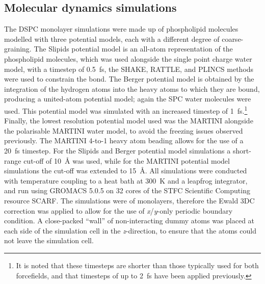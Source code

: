 \subsection{Molecular dynamics simulations}
The DSPC monolayer simulations were made up of phospholipid molecules modelled with three potential models, each with a different degree of coarse-graining.
The Slipids potential model is an all-atom representation of the phospholipid molecules,\autocite{jambeck_derivation_2012} which was used alongside the single point charge water model,\autocite[abbreviated to SPC]{berendsen_missing_1987} with a timestep of \SI{0.5}{\femto\second}, the SHAKE, RATTLE, and PLINCS methods were used to constrain the  bond.\autocite{miyamoto_settle_1992,hess_p-lincs_2008}
The Berger potential model is obtained by the integration of the hydrogen atoms into the heavy atoms to which they are bound, producing a united-atom potential model;\autocite{berger_molecular_1997} again the SPC water molecules were used.
This potential model was simulated with an increased timestep of \SI{1}{\femto\second}.\footnote{It is noted that these timesteps are shorter than those typically used for both forcefields, and that timesteps of up to \SI{2}{\femto\second} have been applied previously.}
Finally, the lowest resolution potential model used was the MARTINI\autocite{marrink_martini_2007} alongside the polarisable MARTINI water model,\autocite{yesylevskyy_polarizable_2010} to avoid the freezing issues observed previously.\autocite{koutsioubas_combined_2016}
The MARTINI 4-to-1 heavy atom beading allows for the use of a \SI{20}{\femto\second} timestep.
For the Slipids and Berger potential model simulations a short-range cut-off of \SI{10}{\angstrom} was used, while for the MARTINI potential model simulations the cut-off was extended to \SI{15}{\angstrom}.
All simulations were conducted with temperature coupling to a heat bath at \SI{300}{\kelvin} and a leapfrog integrator, and run using GROMACS 5.0.5\autocite{berendsen_gromacs_1995,lindahl_gromacs_2001,van_der_spoel_gromacs_2005,hess_gromacs_2008} on \num{32} cores of the STFC Scientific Computing resource SCARF.
The simulations were of monolayers, therefore the Ewald 3DC correction was applied to allow for the use of \emph{x}/\emph{y}-only periodic boundary condition.\autocite{yeh_ewald_1999}
A close-packed ``wall'' of non-interacting dummy atoms was placed at each side of the simulation cell in the \emph{z}-direction, to ensure that the atoms could not leave the simulation cell.

